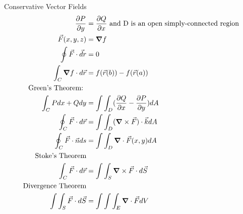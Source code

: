 \documentclass[12pt]{article}
\newcommand{\gv}[1]{\ensuremath{\mbox{\boldmath$ #1 $}}}
\newcommand{\grad}[1]{\gv{\nabla} #1} %
\renewcommand{\div}[1]{\gv{\nabla} \cdot #1} %
\newcommand{\curl}[1]{\gv{\nabla} \times #1} %
\renewcommand{\=}[1]{\stackrel{#1}{=}} %
\theoremstyle{definition}
\theoremstyle{remark}
\begin{document}
Conservative Vector Fields
\begin{align*}
    \frac{\partial P}{\partial y} &= \frac{\partial Q}{\partial x}
  \textrm{   and D is an open simply-connected region}\\
  \vec F(x,y,z) &= \grad f\\
  \oint \vec F \cdot \vec dr &= 0\\
  \int_C\grad f \cdot d \vec r &= f(\vec r(b)) - f(\vec r(a))\\
   \textrm{Green's Theorem: }\\
   \int_C P dx+ Qdy &= \int\int_D(\frac{\partial Q}{\partial
     x}-\frac{\partial P}{\partial y})dA\\
   \oint_C\vec F \cdot d\vec r &= \int \int_D (\curl \vec F)\cdot \vec
   k dA\\
   \oint_C\vec F \cdot \vec n ds &= \int\int_D \div {\vec F(x,y)} dA\\
   \textrm{Stoke's Theorem}\\
   \int_C\vec F \cdot d\vec r &= \int\int_S \curl \vec F \cdot d \vec
   S\\
   \textrm{Divergence Theorem}\\
   \int\int_S \vec F \cdot d \vec S &= \int\int\int_E \div {\vec F} dV
\end{align*}
\end{document}
